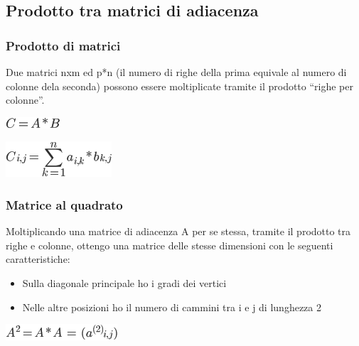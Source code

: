\documentclass{article}
\providecommand{\tightlist}{%
  \setlength{\itemsep}{0pt}\setlength{\parskip}{0pt}}
\begin{document}
{}

\hypertarget{h.akx1r9fzvwzo}{\subsection{\texorpdfstring{{Prodotto tra
matrici di
adiacenza}}{Prodotto tra matrici di adiacenza}}\label{h.akx1r9fzvwzo}}

{}

\hypertarget{h.c39ti8il3qtf}{\subsubsection{\texorpdfstring{{Prodotto di
matrici}}{Prodotto di matrici}}\label{h.c39ti8il3qtf}}

{Due matrici nxm ed p*n (il numero di righe della prima equivale al
numero di colonne dela seconda) possono essere moltiplicate tramite il
prodotto ``righe per colonne''.}

\includegraphics{images/image406.png}

\includegraphics{images/image407.png}

\hypertarget{h.md5vuljp7xm}{\subsubsection{\texorpdfstring{{Matrice al
quadrato}}{Matrice al quadrato}}\label{h.md5vuljp7xm}}

{}

{Moltiplicando una matrice di adiacenza A per se stessa, tramite il
prodotto tra righe e colonne, ottengo una matrice delle stesse
dimensioni con le seguenti caratteristiche:}

\begin{itemize}
\tightlist
\item
  {Sulla diagonale principale ho i gradi dei vertici}
\item
  {Nelle altre posizioni ho il numero di cammini tra i e j di lunghezza
  2}
\end{itemize}

{}

\includegraphics{images/image408.png}
\end{document}
